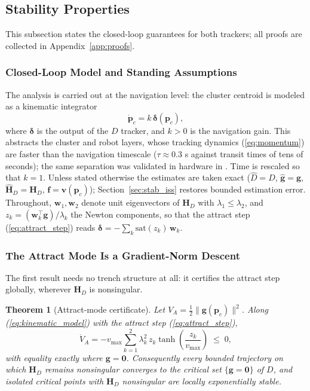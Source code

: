 \documentclass[lettersize,journal]{IEEEtran}
\newtheorem{theorem}{Theorem}
\begin{document}
\subsection{Stability Properties}
\label{sec:stability}

This subsection states the closed-loop guarantees for both trackers;
all proofs are collected in Appendix~\ref{app:proofs}.

\subsubsection{Closed-Loop Model and Standing Assumptions}

The analysis is carried out at the navigation level: the cluster
centroid is modeled as a kinematic integrator
\begin{equation}
    \dot{\mathbf{p}}_c = k\,\boldsymbol{\delta}(\mathbf{p}_c),
    \label{eq:kinematic_model}
\end{equation}
where $\boldsymbol{\delta}$ is the output of the $D$ tracker,
and $k > 0$ is the navigation gain. This abstracts the cluster and
robot layers, whose
tracking dynamics (\ref{eq:momentum}) are faster than the navigation
timescale ($\tau \approx 0.3$ s against transit times of tens of seconds);
the same separation was validated in hardware in \cite{14}. Time is rescaled
so that $k = 1$. Unless stated otherwise the estimates are taken exact
($\hat{D} = D$, $\hat{\mathbf{g}} = \mathbf{g}$, $\hat{\mathbf{H}}_D =
\mathbf{H}_D$, $\mathbf{f} = \mathbf{v}(\mathbf{p}_c)$);
Section~\ref{sec:stab_iss} restores bounded estimation error.
Throughout, $\mathbf{w}_1, \mathbf{w}_2$ denote unit eigenvectors of
$\mathbf{H}_D$ with $\lambda_1 \leq \lambda_2$, and $z_k =
(\mathbf{w}_k^\top \mathbf{g})/\lambda_k$ the Newton components, so
that the attract step (\ref{eq:attract_step}) reads
$\boldsymbol{\delta} = -\sum_k \mathrm{sat}(z_k)\,\mathbf{w}_k$.

\subsubsection{The Attract Mode Is a Gradient-Norm Descent}

The first result needs no trench structure at all: it certifies the attract step
globally, wherever $\mathbf{H}_D$ is nonsingular.

\begin{theorem}[Attract-mode certificate]
\label{thm:attract}
Let $V_A = \tfrac{1}{2}\|\mathbf{g}(\mathbf{p}_c)\|^2$. Along
(\ref{eq:kinematic_model}) with the attract step
(\ref{eq:attract_step}),
\begin{equation}
    \dot{V}_A = -v_{\max} \sum_{k=1}^{2} \lambda_k^2\,
    z_k \tanh\!\left(\frac{z_k}{v_{\max}}\right) \;\leq\; 0,
    \label{eq:VA_dot}
\end{equation}
with equality exactly where $\mathbf{g} = \mathbf{0}$. Consequently
every bounded trajectory on which $\mathbf{H}_D$ remains nonsingular
converges to the critical set $\{\mathbf{g} = \mathbf{0}\}$ of $D$, and
isolated critical points with $\mathbf{H}_D$ nonsingular are locally
exponentially stable.
\end{theorem}
\end{document}
